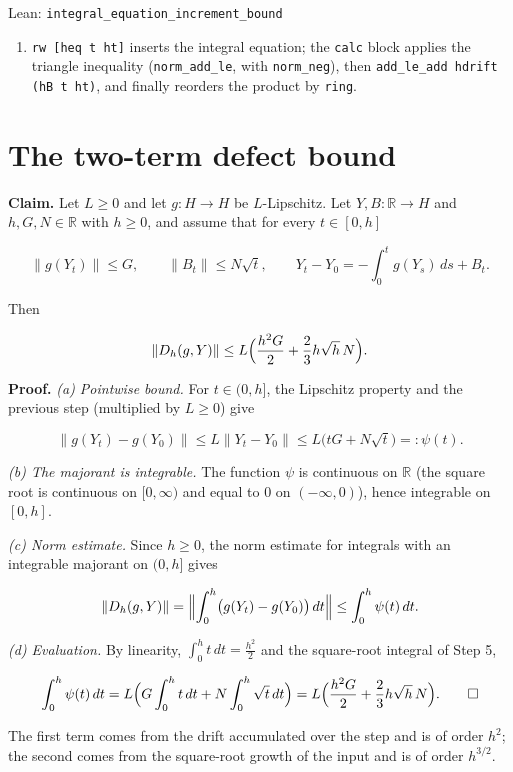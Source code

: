 \documentclass[11pt,a4paper]{article}
\begin{document}
\begin{leanbox}{Lean: \texttt{integral\_\allowbreak{}equation\_\allowbreak{}increment\_\allowbreak{}bound}}
\begin{enumerate}
\item \texttt{rw [heq t ht]} inserts the integral equation; the \texttt{calc} block applies the triangle inequality (\texttt{norm\_\allowbreak{}add\_\allowbreak{}le}, with \texttt{norm\_\allowbreak{}neg}), then \texttt{add\_\allowbreak{}le\_\allowbreak{}add hdrift (h\allowbreak{}B t ht)}, and finally reorders the product by \texttt{ring}.

\end{enumerate}
\end{leanbox}

\section{\texorpdfstring{The two-term defect bound}{The two-term defect bound}}


\textbf{Claim.} Let \(L\ge0\) and let \(g:H\to H\) be \(L\)-Lipschitz. Let \(Y,B:\mathbb R\to H\) and \(h,G,N\in\mathbb R\) with \(h\ge0\), and assume that for every \(t\in[0,h]\)


\[\|g(Y_t)\|\le G,\qquad\|B_t\|\le N\sqrt t,\qquad Y_t-Y_0=-\int_0^tg(Y_s)\,ds+B_t.\]


Then


\[\|D_h(g,Y)\|\le L\Bigl(\frac{h^2G}2+\frac23h\sqrt h\,N\Bigr).\]


\textbf{Proof.} \emph{(a) Pointwise bound.} For \(t\in(0,h]\), the Lipschitz property and the previous step (multiplied by \(L\ge0\)) give


\[\|g(Y_t)-g(Y_0)\|\le L\|Y_t-Y_0\|\le L\bigl(tG+N\sqrt t\bigr)=:\psi(t).\]


\emph{(b) The majorant is integrable.} The function \(\psi\) is continuous on \(\mathbb R\) (the square root is continuous on \([0,\infty)\) and equal to \(0\) on \((-\infty,0)\)), hence integrable on \([0,h]\).




\emph{(c) Norm estimate.} Since \(h\ge0\), the norm estimate for integrals with an integrable majorant on \((0,h]\) gives


\[\|D_h(g,Y)\|=\Bigl\|\int_0^h\bigl(g(Y_t)-g(Y_0)\bigr)\,dt\Bigr\|\le\int_0^h\psi(t)\,dt.\]


\emph{(d) Evaluation.} By linearity, \(\int_0^ht\,dt=\frac{h^2}2\) and the square-root integral of Step 5,


\[\int_0^h\psi(t)\,dt=L\Bigl(G\int_0^ht\,dt+N\int_0^h\sqrt t\,dt\Bigr)=L\Bigl(\frac{h^2G}2+\frac23h\sqrt h\,N\Bigr).\qquad\square\]


The first term comes from the drift accumulated over the step and is of order \(h^2\); the second comes from the square-root growth of the input and is of order \(h^{3/2}\).
\end{document}
